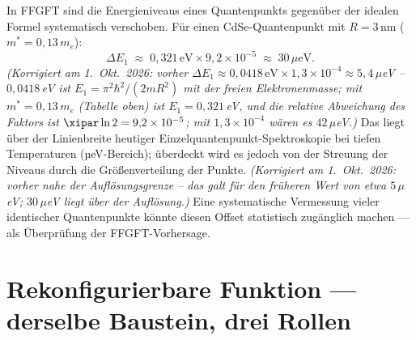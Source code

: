 \begin{keyresult}
In FFGFT sind die Energieniveaus eines Quantenpunkts gegenüber
der idealen Formel systematisch verschoben. Für einen CdSe-Quantenpunkt
mit $R = 3$\,nm ($m^* = 0{,}13\,m_e$):
\[
  \Delta E_1 \;\approx\; 0{,}321\,\text{eV} \times 9{,}2 \times 10^{-5}
  \;\approx\; 30\,\mu\text{eV}.
\]
\textit{(Korrigiert am 1.~Okt.~2026: vorher $\Delta E_1 \approx 0{,}0418\,\text{eV} \times 1{,}3 \times 10^{-4} \approx 5{,}4\,\mu$eV -- $0{,}0418$\,eV ist $E_1 = \pi^2\hbar^2/(2mR^2)$ mit der freien Elektronenmasse; mit $m^* = 0{,}13\,m_e$ (Tabelle oben) ist $E_1 = 0{,}321$\,eV, und die relative Abweichung des Faktors ist $\xipar\ln 2 = 9{,}2 \times 10^{-5}$; mit $1{,}3 \times 10^{-4}$ wären es $42\,\mu$eV.)}
Das liegt über der Linienbreite heutiger
Einzelquantenpunkt-Spektroskopie bei tiefen Temperaturen (µeV-Bereich);
überdeckt wird es jedoch von der Streuung der Niveaus durch die Größenverteilung der Punkte. \textit{(Korrigiert am 1.~Okt.~2026: vorher \glqq nahe der Auflösungsgrenze\grqq{} -- das galt für den früheren Wert von etwa $5\,\mu$eV; $30\,\mu$eV liegt über der Auflösung.)}
Eine systematische Vermessung vieler identischer Quantenpunkte
könnte diesen Offset statistisch zugänglich machen ---
als Überprüfung der FFGFT-Vorhersage.
\end{keyresult}

\section{Rekonfigurierbare Funktion --- derselbe Baustein, drei Rollen}
\label{sec:rollen}

\begin{center}
\end{center}


